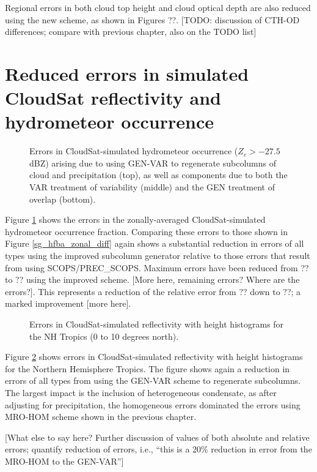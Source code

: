 Regional errors in both cloud top height and cloud optical depth are also reduced using the new scheme, as shown in Figures ??. [TODO: discussion of CTH-OD differences; compare with previous chapter, also on the TODO list]


\section{Reduced errors in simulated CloudSat reflectivity and hydrometeor occurrence}
\label{subgrid2_active_section}
\begin{figure}
\centering
\caption{Errors in CloudSat-simulated hydrometeor occurrence ($Z_e > -27.5$ dBZ) arising due to using GEN-VAR to regenerate subcolumns of cloud and precipitation (top), as well as components due to both the VAR treatment of variability (middle) and the GEN treatment of overlap (bottom).}
\label{sgi_hfba_zonal_diff}
\end{figure}
Figure \ref{sgi_hfba_zonal_diff} shows the errors in the zonally-averaged CloudSat-simulated hydrometeor occurrence fraction. Comparing these errors to those shown in Figure \ref{sg_hfba_zonal_diff} again shows a substantial reduction in errors of all types using the improved subcolumn generator relative to those errors that result from using SCOPS/PREC\_SCOPS. Maximum errors have been reduced from ?? to ?? using the improved scheme. [More here, remaining errors? Where are the errors?]. This represents a reduction of the relative error from ?? down to ??; a marked improvement [more here].

\begin{figure}
\centering
\caption{Errors in CloudSat-simulated reflectivity with height histograms for the NH Tropics (0 to 10 degrees north).}
\label{sgi_cfadDbze94_nhtropics_diff}
\end{figure}
Figure \ref{sgi_cfadDbze94_nhtropics_diff} shows errors in CloudSat-simulated reflectivity with height histograms for the Northern Hemisphere Tropics. The figure shows again a reduction in errors of all types from using the GEN-VAR scheme to regenerate subcolumns. The largest impact is the inclusion of heterogeneous condensate, as after adjusting for precipitation, the homogeneous errors dominated the errors using MRO-HOM scheme shown in the previous chapter. 

[What else to say here? Further discussion of values of both absolute and relative errors; quantify reduction of errors, i.e., ``this is a 20\% reduction in error from the MRO-HOM to the GEN-VAR'']

